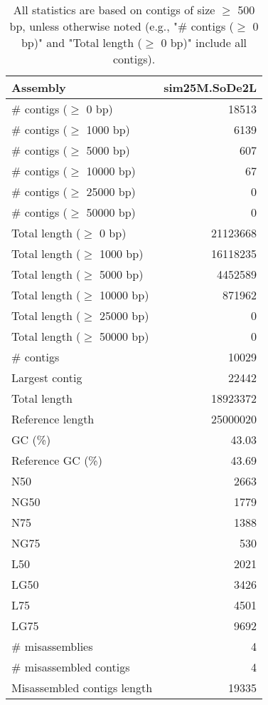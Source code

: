 \documentclass[12pt,a4paper]{article}
\begin{document}
\begin{table}[ht]
\begin{center}
\caption{All statistics are based on contigs of size $\geq$ 500 bp, unless otherwise noted (e.g., "\# contigs ($\geq$ 0 bp)" and "Total length ($\geq$ 0 bp)" include all contigs).}
\begin{tabular}{|l*{1}{|r}|}
\hline
Assembly & sim25M.SoDe2L \\ \hline
\# contigs ($\geq$ 0 bp) & 18513 \\ \hline
\# contigs ($\geq$ 1000 bp) & 6139 \\ \hline
\# contigs ($\geq$ 5000 bp) & 607 \\ \hline
\# contigs ($\geq$ 10000 bp) & 67 \\ \hline
\# contigs ($\geq$ 25000 bp) & 0 \\ \hline
\# contigs ($\geq$ 50000 bp) & 0 \\ \hline
Total length ($\geq$ 0 bp) & 21123668 \\ \hline
Total length ($\geq$ 1000 bp) & 16118235 \\ \hline
Total length ($\geq$ 5000 bp) & 4452589 \\ \hline
Total length ($\geq$ 10000 bp) & 871962 \\ \hline
Total length ($\geq$ 25000 bp) & 0 \\ \hline
Total length ($\geq$ 50000 bp) & 0 \\ \hline
\# contigs & 10029 \\ \hline
Largest contig & 22442 \\ \hline
Total length & 18923372 \\ \hline
Reference length & 25000020 \\ \hline
GC (\%) & 43.03 \\ \hline
Reference GC (\%) & 43.69 \\ \hline
N50 & 2663 \\ \hline
NG50 & 1779 \\ \hline
N75 & 1388 \\ \hline
NG75 & 530 \\ \hline
L50 & 2021 \\ \hline
LG50 & 3426 \\ \hline
L75 & 4501 \\ \hline
LG75 & 9692 \\ \hline
\# misassemblies & 4 \\ \hline
\# misassembled contigs & 4 \\ \hline
Misassembled contigs length & 19335 \\ \hline

\end{tabular}
\end{center}
\end{table}
\end{document}
